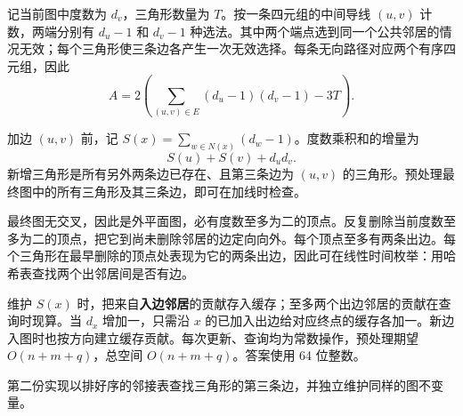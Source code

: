 \Legend
记当前图中度数为 $d_v$，三角形数量为 $T$。按一条四元组的中间导线 $(u,v)$ 计数，两端分别有 $d_u-1$ 和 $d_v-1$ 种选法。其中两个端点选到同一个公共邻居的情况无效；每个三角形使三条边各产生一次无效选择。每条无向路径对应两个有序四元组，因此
$$
A=2\left(\sum_{(u,v)\in E}(d_u-1)(d_v-1)-3T\right).
$$

加边 $(u,v)$ 前，记 $S(x)=\sum_{w\in N(x)}(d_w-1)$。度数乘积和的增量为
$$
S(u)+S(v)+d_ud_v.
$$
新增三角形是所有另外两条边已存在、且第三条边为 $(u,v)$ 的三角形。预处理最终图中的所有三角形及其三条边，即可在加线时检查。

最终图无交叉，因此是外平面图，必有度数至多为二的顶点。反复删除当前度数至多为二的顶点，把它到尚未删除邻居的边定向向外。每个顶点至多有两条出边。每个三角形在最早删除的顶点处表现为它的两条出边，因此可在线性时间枚举：用哈希表查找两个出邻居间是否有边。

维护 $S(x)$ 时，把来自\textbf{入边邻居}的贡献存入缓存；至多两个出边邻居的贡献在查询时现算。当 $d_x$ 增加一，只需沿 $x$ 的已加入出边给对应终点的缓存各加一。新边入图时也按方向建立缓存贡献。每次更新、查询均为常数操作，预处理期望 $O(n+m+q)$，总空间 $O(n+m+q)$。答案使用 64 位整数。

第二份实现以排好序的邻接表查找三角形的第三条边，并独立维护同样的图不变量。
